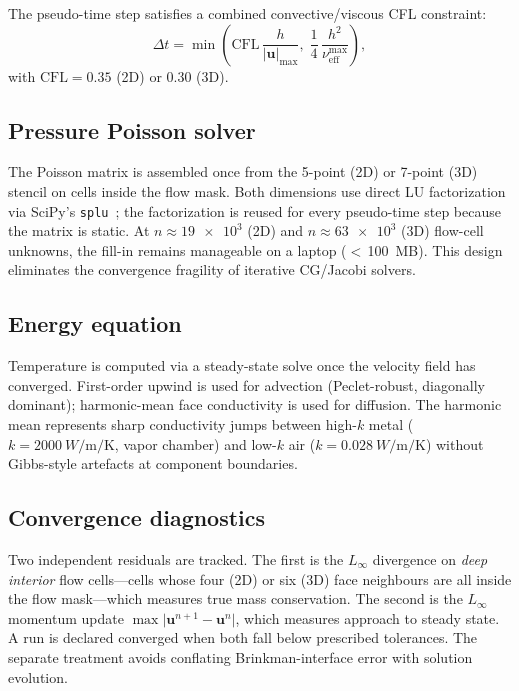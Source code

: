 \documentclass[10pt,twocolumn,letterpaper]{article}
\newcommand{\ubf}{\mathbf{u}}
\newcommand{\nueff}{\nu_{\mathrm{eff}}}
\newcommand{\Linf}{L_{\infty}}
\begin{document}
The pseudo-time step satisfies a combined convective/viscous CFL
constraint:
%
\begin{equation}
  \Delta t = \min\!\left(
    \mathrm{CFL}\,\frac{h}{|\ubf|_{\max}},\;
    \frac{1}{4}\,\frac{h^{2}}{\nueff^{\max}}\right),
  \label{eq:cfl}
\end{equation}
%
with $\mathrm{CFL} = 0.35$ (2D) or $0.30$ (3D).

\subsection{Pressure Poisson solver}

The Poisson matrix is assembled once from the 5-point (2D) or
7-point (3D) stencil on cells inside the flow mask. Both dimensions
use direct LU factorization via SciPy's \texttt{splu}~\cite{scipy};
the factorization is reused for every pseudo-time step because the
matrix is static. At $n \approx \num{19e3}$ (2D) and
$n \approx \num{63e3}$ (3D) flow-cell unknowns, the fill-in remains
manageable on a laptop ($<$\,\SI{100}{MB}). This design eliminates
the convergence fragility of iterative CG/Jacobi solvers.

\subsection{Energy equation}

Temperature is computed via a steady-state solve once the velocity
field has converged. First-order upwind is used for advection
(Peclet-robust, diagonally dominant); harmonic-mean face
conductivity is used for diffusion. The harmonic mean represents
sharp conductivity jumps between high-$k$ metal
($k = \SI{2000}{W\per\meter\per\kelvin}$, vapor chamber) and low-$k$ air
($k = \SI{0.028}{W\per\meter\per\kelvin}$) without Gibbs-style
artefacts at component boundaries.

\subsection{Convergence diagnostics}

Two independent residuals are tracked. The first is the
$\Linf$ divergence on \emph{deep interior} flow cells---cells whose
four (2D) or six (3D) face neighbours are all inside the flow mask---which measures
true mass conservation. The second is the $\Linf$ momentum update
$\max\lvert\ubf^{n+1}-\ubf^{n}\rvert$, which measures approach to
steady state. A run is declared converged when both fall below
prescribed tolerances. The separate treatment avoids conflating
Brinkman-interface error with solution evolution.
\end{document}
